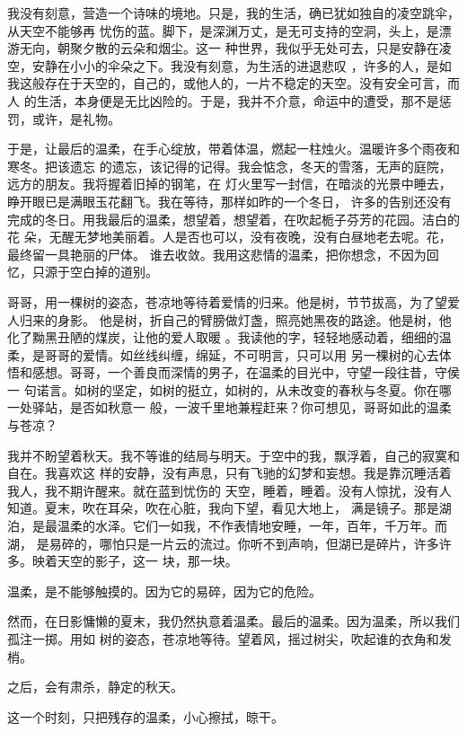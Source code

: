\documentclass[12pt,a4paper]{article}
\begin{document}
		我没有刻意，营造一个诗味的境地。只是，我的生活，确已犹如独自的凌空跳伞，从天空不能够再
	忧伤的蓝。脚下，是深渊万丈，是无可支持的空洞，头上，是漂游无向，朝聚夕散的云朵和烟尘。这一
	种世界，我似乎无处可去，只是安静在凌空，安静在小小的伞朵之下。我没有刻意，为生活的进退悲叹
	，许多的人，是如我这般存在于天空的，自己的，或他人的，一片不稳定的天空。没有安全可言，而人
	的生活，本身便是无比凶险的。于是，我并不介意，命运中的遭受，那不是惩罚，或许，是礼物。

		于是，让最后的温柔，在手心绽放，带着体温，燃起一柱烛火。温暖许多个雨夜和寒冬。把该遗忘
	的遗忘，该记得的记得。我会惦念，冬天的雪落，无声的庭院，远方的朋友。我将握着旧掉的钢笔，在
	灯火里写一封信，在暗淡的光景中睡去，睁开眼已是满眼玉花翻飞。我在等待，那样如昨的一个冬日，
	许多的告别还没有完成的冬日。用我最后的温柔，想望着，想望着，在吹起栀子芬芳的花园。洁白的花
	朵，无醒无梦地美丽着。人是否也可以，没有夜晚，没有白昼地老去呢。花，最终留一具艳丽的尸体。
	谁去收敛。我用这悲情的温柔，把你想念，不因为回忆，只源于空白掉的道别。

		哥哥，用一棵树的姿态，苍凉地等待着爱情的归来。他是树，节节拔高，为了望爱人归来的身影。
	他是树，折自己的臂膀做灯盏，照亮她黑夜的路途。他是树，他化了黝黑丑陋的煤炭，让他的爱人取暖
	。我读他的字，轻轻地感动着，细细的温柔，是哥哥的爱情。如丝线纠缠，绵延，不可明言，只可以用
	另一棵树的心去体悟和感想。哥哥，一个善良而深情的男子，在温柔的目光中，守望一段往昔，守侯一
	句诺言。如树的坚定，如树的挺立，如树的，从未改变的春秋与冬夏。你在哪一处驿站，是否如秋意一
	般，一波千里地兼程赶来？你可想见，哥哥如此的温柔与苍凉？

		我并不盼望着秋天。我不等谁的结局与明天。于空中的我，飘浮着，自己的寂寞和自在。我喜欢这
	样的安静，没有声息，只有飞驰的幻梦和妄想。我是靠沉睡活着我人，我不期许醒来。就在蓝到忧伤的
	天空，睡着，睡着。没有人惊扰，没有人知道。夏末，吹在耳朵，吹在心脏，我向下望，看见大地上，
	满是镜子。那是湖泊，是最温柔的水泽。它们一如我，不作表情地安睡，一年，百年，千万年。而湖，
	是易碎的，哪怕只是一片云的流过。你听不到声响，但湖已是碎片，许多许多。映着天空的影子，这一
	块，那一块。


		温柔，是不能够触摸的。因为它的易碎，因为它的危险。

		然而，在日影慵懒的夏末，我仍然执意着温柔。最后的温柔。因为温柔，所以我们孤注一掷。用如
	树的姿态，苍凉地等待。望着风，摇过树尖，吹起谁的衣角和发梢。


		之后，会有肃杀，静定的秋天。

		这一个时刻，只把残存的温柔，小心擦拭，晾干。

	\endwriting
\end{document}
